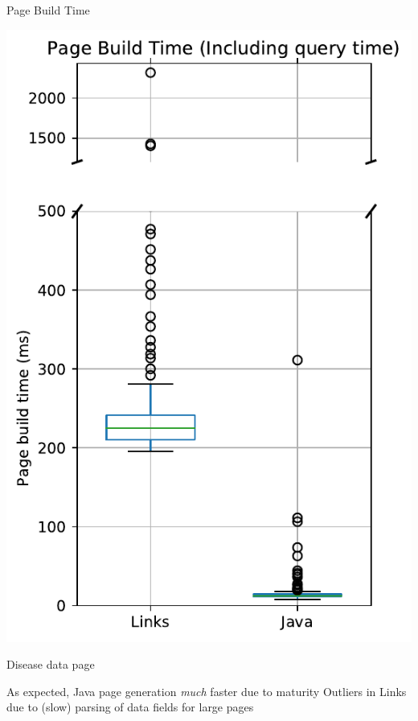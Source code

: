 \documentclass[11.5pt, aspectratio=169]{beamer}
\begin{document}
\begin{frame}{Page Build Time}
\begin{minipage}[t]{0.48\textwidth}
    \includegraphics[scale=0.33]{images/diseasedisplay_pagebuild_incl_box.pdf}

    \vspace{-0.75em}
    \begin{center}
      Disease data page
    \end{center}
  \end{minipage}
  \vspace{1em}

  \begin{fullpageitemize}
  \itemR As expected, Java page generation \emph{much} faster due to maturity
  \itemR Outliers in Links due to (slow) parsing of data fields for large pages
  \end{fullpageitemize}
\end{frame}
\end{document}

